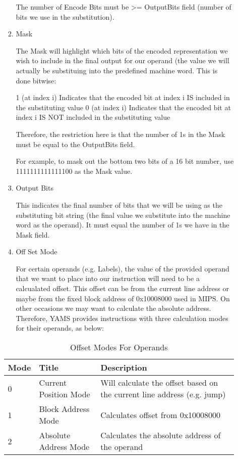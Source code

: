 \begin{enumerate}
\begin{enumerate}
\begin{enumerate}
The number of Encode Bits must be >= OutputBits field (number of bits we use in the substitution).

\item Mask

The Mask will highlight which bits of the encoded representation we wish to include in the final output for our operand (the value we will actually be substituing into the predefined machine word. This is done bitwise:

1 (at index i)	Indicates that the encoded bit at index i IS included in the substituting value
0 (at index i)	Indicates that the encoded bit at index i IS NOT included in the substituting value

Therefore, the restriction here is that the number of 1s in the Mask must be equal to the OutputBits field.

For example, to mask out the bottom two bits of a 16 bit number, use 1111111111111100 as the Mask value.

\item Output Bits

This indicates the final number of bits that we will be using as the substituting bit string (the final value we substitute into the machine word as the operand). It must equal the number of 1s we have in the Mask field.

\item Off Set Mode

For certain operands (e.g. Labels), the value of the provided operand that we want to place into our instruction will need to be a calcualated offset. This offset can be from the current line address or maybe from the fixed block address of 0x10008000 used in MIPS. On other occasions we may want to calculate the absolute address. Therefore, YAMS provides instructions with three calculation modes for their operands, as below:

\end{enumerate}

\begin{table}[]
\begin{center}
	\begin{tabular}{|l|l|p{2.5in}|}
	\hline
	Mode	&	Title	&	Description \\
	\hline
	0	&	Current Position Mode		&	Will calculate the offset based on the current line address (e.g. jump) \\
	1	&	Block Address Mode			&	Calculates offset from 0x10008000 \\
	2	&	Absolute Address Mode		&	Calculates the absolute address of the operand \\
	\hline
	\end{tabular}
\caption{Offset Modes For Operands}
\end{center}
\end{table}

\end{enumerate}
\end{enumerate}

